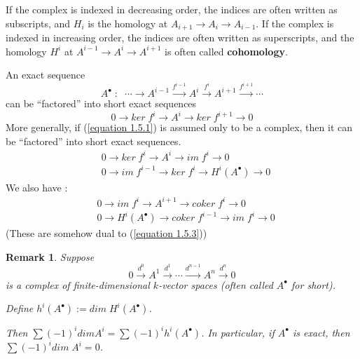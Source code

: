 \documentclass{article}
\newtheorem{remark}[theorem]{Remark}
\begin{document}
If the complex is indexed in decreasing order, the indices are often written as subscripts, and $H_i$ is the homology at $A_{i+1} \rightarrow A_i \rightarrow A_{i-1}$. If the complex is indexed
in increasing order, the indices are often written as superscripts, and the homology
$H^i$ at $A^{i-1} \rightarrow A^i \rightarrow A^{i+1}$
is often called \textbf{cohomology}.

An exact sequence
\begin{equation}
    A^\bullet\; :
    \;\;
    \cdots \rightarrow A^{i-1} \xrightarrow{f^{i-1}}
    A^{i}
    \xrightarrow{f^{i}}
    A^{i+1}
    \xrightarrow{f^{i+1}}
    \cdots
\end{equation}
can be “factored” into short exact sequences
$$
    0\rightarrow
    ker\;f^i
    \rightarrow
    A^{i}
    \rightarrow
    ker\;f^{i+1}
    \rightarrow
    0
$$
More generally, if (\ref{equation 1.5.1}) is assumed only to be a complex, then it can be
“factored” into short exact sequences.
\begin{equation}
\begin{split}
    &0\rightarrow
    ker\;f^i
    \rightarrow
    A^{i}
    \rightarrow
    im\;f^{i}
    \rightarrow
    0
    \\    
    &0\rightarrow
    im\;f^{i-1}
    \rightarrow
    ker\;f^i
    \rightarrow
    H^i(A^\bullet)
    \rightarrow
    0
    \label{equation 1.5.3}
\end{split}
\end{equation}
We also have :
\begin{equation}
\begin{split}
    &0\rightarrow
    im\;f^i
    \rightarrow
    A^{i+1}
    \rightarrow
    coker\;f^{i}
    \rightarrow
    0
    \\    
    &0\rightarrow
    H^i(A^\bullet)    
    \rightarrow
    coker\;f^{i-1}
    \rightarrow
    im\;f^{i}
    \rightarrow
    0
    \label{equation 1.5.4}
\end{split}
\end{equation}
(These are somehow dual to (\ref{equation 1.5.3}))
\begin{remark}
    Suppose
    $$
    0
    \xrightarrow{d^0}
    A^1
    \xrightarrow{d^1}
    \cdots
    \xrightarrow{d^{n-1}}
    A^n
    \xrightarrow{d^n}
    0
    $$
    is a complex of finite-dimensional $k$-vector spaces (often called $A^\bullet$ for short).
    
    Define $h^i(A^\bullet) := dim\; H^i(A^\bullet)$.

     Then $\sum(-1)^i dim A^i =\sum(-1)^ih^i(A^\bullet)$. In particular, if $A^\bullet$ is exact, then $\sum(-1)^i dim\; A^i = 0$.
\end{remark}
\end{document}
